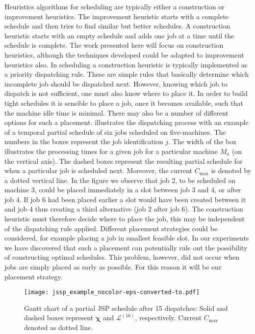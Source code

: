 \documentclass[smallextended]{svjour3}
\renewcommand{\vchi}{\bm \chi}
\begin{document}
Heuristics algorithms for scheduling are typically either a
construction or improvement heuristics. The improvement heuristic
starts with a complete schedule and then tries to find similar but
better schedules.  A construction heuristic starts with an empty
schedule and adds one job at a time until the schedule is complete.
The work presented here will focus on construction heuristics,
although the techniques developed could be adapted to improvement
heuristics also. In scheduling a construction heuristic is typically
implemented as a priority dispatching rule. These are simple rules
that basically determine which incomplete job should be dispatched
next. However, knowing which job to dispatch is not sufficient, one
must also know where to place it. In order to build tight schedules it
is sensible to place a job, once it becomes available, such that
the machine idle time is minimal. There may also be a number of
different options for such a placement. 
illustrates the dispatching process with an example of a temporal
partial schedule of six jobs scheduled on five-machines. The numbers
in the boxes represent the job identification $j$. The width of the
box illustrates the processing times for a given job for a particular
machine $M_a$ (on the vertical axis). The dashed boxes represent the
resulting partial schedule for when a particular job is scheduled
next. Moreover, the current $C_{\max}$ is denoted by a dotted vertical
line. In the figure we observe that job 2, to be scheduled on machine
3, could be placed immediately in a slot between job 3 and 4, or after
job 4. If job 6 had been placed earlier a slot would
have been created between it and job 4 thus creating a third
alternative (job 2 after job 6). The construction heuristic must
therefore decide where to place the job, this may be independent of
the dispatching rule applied. Different placement strategies could be
considered, for example placing a job in smallest feasible slot. In
our experiments we have discovered that such a placement can
potentially rule out the possibility of constructing optimal
schedules. This problem, however, did not occur when jobs are simply
placed as early as possible. For this reason it will be our placement strategy.
	
\begin{figure}[t!]\centering
  \texttt{[image: jssp\_example\_nocolor-eps-converted-to.pdf]}
  \caption[Gantt chart of a partial JSP schedule]{Gantt chart of a
    partial JSP schedule after 15 dispatches: Solid and dashed boxes
    represent $\vchi$ and $\mathcal{L}^{(16)}$, respectively. Current
    $C_{\max}$ denoted as dotted line.}
  \label{fig:jssp:example}
\end{figure}
	
\end{document}

